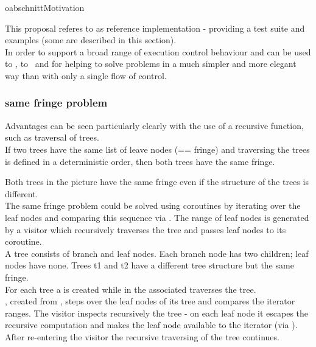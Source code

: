 oabschnitt{Motivation}

This proposal referes to \boostcoroutine as reference implementation - providing
a test suite and examples (some are described in this section).\\
\newline
In order to support a broad range of execution control behaviour \pushcoro and
\pullcoro can be used to \escrecloops, to \escreccomps~and for \coopmultitasking
helping to solve problems in a much simpler and more elegant way than with only
a single flow of control.\\

\subsubsection*{same fringe problem}
Advantages can be seen particularly clearly with the use of a recursive
function, such as traversal of trees.\\
If two trees have the same list of leave nodes (== fringe) and traversing the
trees is defined in a deterministic order, then both trees have the same fringe.\\


Both trees in the picture have the same fringe even if the structure of the trees
is different.\\
\newline
The same fringe problem could be solved using coroutines by iterating over the
leaf nodes and comparing this sequence via . The range of leaf
nodes is generated by a visitor which recursively traverses the tree and passes
leaf nodes to its coroutine.\\
\newline
{}
A tree consists of branch and leaf nodes. Each branch node has two children;
leaf nodes have none. Trees t1 and t2 have a different tree structure but the
same fringe.\\
For each tree a \pullcoro is created while in the associated \corofunction
{} traverses the tree.\\
\pullcoroiterator, created from \pullcoro, steps over the leaf nodes of its tree and
 compares the iterator ranges.
\newline
\newline
{}
The visitor inspects recursively the tree - on each leaf node it escapes the
recursive computation and makes the leaf node available to the iterator (via
\pushcoro). After re-entering the visitor the recursive traversing of the tree
continues.
